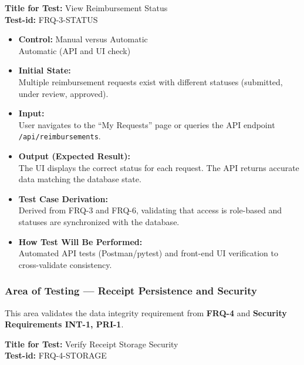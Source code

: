 \documentclass[12pt, titlepage]{article}
\begin{document}
\textbf{Title for Test:} View Reimbursement Status \\
\textbf{Test-id:} FRQ-3-STATUS

\begin{itemize}
    \item \textbf{Control:} Manual versus Automatic \\
    Automatic (API and UI check)
    \item \textbf{Initial State:} \\
    Multiple reimbursement requests exist with different statuses (submitted, under review, approved).
    \item \textbf{Input:} \\
    User navigates to the ``My Requests'' page or queries the API endpoint \texttt{/api/reimbursements}.
    \item \textbf{Output (Expected Result):} \\
    The UI displays the correct status for each request. The API returns accurate data matching the database state.
    \item \textbf{Test Case Derivation:} \\
    Derived from FRQ-3 and FRQ-6, validating that access is role-based and statuses are synchronized with the database.
    \item \textbf{How Test Will Be Performed:} \\
    Automated API tests (Postman/pytest) and front-end UI verification to cross-validate consistency.
\end{itemize}

\subsubsection{Area of Testing — Receipt Persistence and Security}

This area validates the data integrity requirement from \textbf{FRQ-4} and \textbf{Security Requirements INT-1, PRI-1}.

\textbf{Title for Test:} Verify Receipt Storage Security \\
\textbf{Test-id:} FRQ-4-STORAGE
\end{document}
